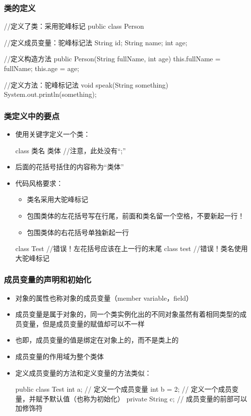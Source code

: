 \begin{frame}[fragile]
  \frametitle{类的定义}
  \begin{javacode}
  //定义了类：采用驼峰标记
  public class Person {
    //定义成员变量：驼峰标记法
    String id;
    String name;
    int age;
    
    //定义构造方法
    public Person(String fullName, int age) {
      this.fullName = fullName;
      this.age = age;
    }

    //定义方法：驼峰标记法
    void speak(String something) {
      System.out.println(something);
    }
    
  }
  \end{javacode}
\end{frame}

\begin{frame}[fragile]
  \frametitle{类定义中的要点}
  \begin{itemize}
    \item 使用关键字定义一个类：
      \begin{javacode}
      class 类名 {
        类体
      } //注意，此处没有“;”
      \end{javacode}
    \item {} 后面的花括号括住的内容称为“类体”
    \item 代码风格要求：
      \begin{itemize}
        \item 类名采用大驼峰标记
        \item 包围类体的左花括号写在行尾，前面和类名留一个空格，不要新起一行！
        \item 包围类体的右花括号单独新起一行
      \end{itemize}
      \begin{javacode}
        class Test
        {//错误！左花括号应该在上一行的末尾
        }
        class test //错误！类名使用大驼峰标记
      \end{javacode}
  \end{itemize}
\end{frame}

\begin{frame}[fragile]
  \frametitle{成员变量的声明和初始化}
  \begin{itemize}
    \item 对象的属性也称对象的成员变量（member variable，field）
    \item 成员变量是属于对象的，同一个类实例化出的不同对象虽然有着相同类型的成员变量，但是成员变量的赋值却可以不一样
    \item 也即，成员变量的值是绑定在对象上的，而不是类上的
    \item 成员变量的作用域为整个类体
    \item 定义成员变量的方法和定义变量的方法类似：
      \begin{javacode}
        public class Test {
          int a; // 定义一个成员变量
          int b = 2; // 定义一个成员变量，并赋予默认值（也称为初始化）
          private String c; // 成员变量的前部可以加修饰符
        }
      \end{javacode}
  \end{itemize}
\end{frame}

